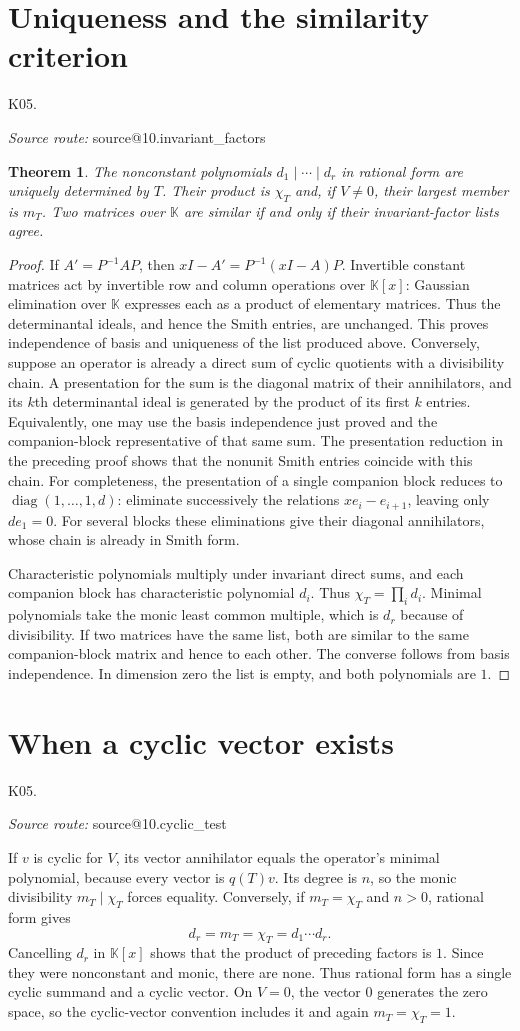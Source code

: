 \documentclass[11pt,a4paper]{book}
\makeatletter
\newtheorem{theorem}{Theorem}[chapter]
\theoremstyle{definition}\newtheorem{definition}[theorem]{Definition}
\theoremstyle{remark}\newtheorem{remark}[theorem]{Remark}
\newcommand{\K}{\mathbb K}\newcommand{\R}{\mathbb R}\newcommand{\C}{\mathbb C}
\DeclareMathOperator{\diag}{diag}\DeclareMathOperator{\id}{id}
\newcommand{\Kentry}[2]{\section{#2}\label{k:#1}\noindent\textsf{\small K05.\detokenize{#1}}\par
  \begingroup\small\color{black!65}\textit{Source route: }\csname source@#1\endcsname\par\endgroup}
\makeatother
\begin{document}
\Kentry{10.invariant_factors}{Uniqueness and the similarity criterion}
\begin{theorem}
The nonconstant polynomials $d_1\mid\cdots\mid d_r$ in rational form are uniquely determined by $T$. Their product is $\chi_T$ and, if $V\ne0$, their largest member is $m_T$. Two matrices over $\K$ are similar if and only if their invariant-factor lists agree.
\end{theorem}
\begin{proof}
If $A'=P^{-1}AP$, then $xI-A'=P^{-1}(xI-A)P$. Invertible constant matrices act by invertible row and column operations over $\K[x]$: Gaussian elimination over $\K$ expresses each as a product of elementary matrices. Thus the determinantal ideals, and hence the Smith entries, are unchanged. This proves independence of basis and uniqueness of the list produced above. Conversely, suppose an operator is already a direct sum of cyclic quotients with a divisibility chain. A presentation for the sum is the diagonal matrix of their annihilators, and its $k$th determinantal ideal is generated by the product of its first $k$ entries. Equivalently, one may use the basis independence just proved and the companion-block representative of that same sum. The presentation reduction in the preceding proof shows that the nonunit Smith entries coincide with this chain. For completeness, the presentation of a single companion block reduces to $\diag(1,\ldots,1,d)$: eliminate successively the relations $xe_i-e_{i+1}$, leaving only $d e_1=0$. For several blocks these eliminations give their diagonal annihilators, whose chain is already in Smith form.

Characteristic polynomials multiply under invariant direct sums, and each companion block has characteristic polynomial $d_i$. Thus $\chi_T=\prod_i d_i$. Minimal polynomials take the monic least common multiple, which is $d_r$ because of divisibility. If two matrices have the same list, both are similar to the same companion-block matrix and hence to each other. The converse follows from basis independence. In dimension zero the list is empty, and both polynomials are $1$.
\end{proof}

\Kentry{10.cyclic_test}{When a cyclic vector exists}
If $v$ is cyclic for $V$, its vector annihilator equals the operator's minimal polynomial, because every vector is $q(T)v$. Its degree is $n$, so the monic divisibility $m_T\mid\chi_T$ forces equality. Conversely, if $m_T=\chi_T$ and $n>0$, rational form gives
\[d_r=m_T=\chi_T=d_1\cdots d_r.\]
Cancelling $d_r$ in $\K[x]$ shows that the product of preceding factors is $1$. Since they were nonconstant and monic, there are none. Thus rational form has a single cyclic summand and a cyclic vector. On $V=0$, the vector $0$ generates the zero space, so the cyclic-vector convention includes it and again $m_T=\chi_T=1$.
\end{document}
